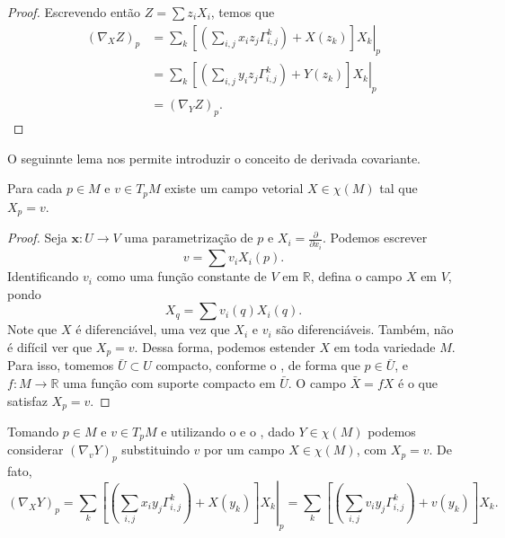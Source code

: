 \begin{lemma}
\begin{proof}
		Escrevendo então $Z=\sum z_{i}X_{i}$, temos que
		\begin{align*}
			(\nabla_{X}Z)_{p} & = \left.\sum_{k}\left[\left( \sum_{i,j}x_{i}z_{j}\Gamma_{i,j}^{k} \right)+X(z_{k})\right]X_{k}\right|_{p} \\
			                  & =\left.\sum_{k}\left[\left( \sum_{i,j}y_{i}z_{j}\Gamma_{i,j}^{k} \right)+Y(z_{k})\right]X_{k}\right|_{p}  \\
			                  & = (\nabla_{Y}Z)_{p}.
		\end{align*}
	\end{proof}
\end{lemma}
O seguinnte lema nos permite introduzir o conceito de derivada covariante.
\begin{lemma}
	\label{lem:vetor-estendido-a-campo}
	Para cada $p \in M$ e $v \in T_{p}M$ existe um campo vetorial $X \in \chi (M)$ tal que $X_{p}=v$.
	\begin{proof}

		Seja $\mathbf{x}:U\to V$ uma parametrização de $p$ e $X_{i}=\frac{\partial}{\partial x_{i}}$. Podemos escrever
		\begin{equation*}
			v=\sum v_{i}X_{i}(p).
		\end{equation*}
		Identificando $v_{i}$ como uma função constante de $V$ em $\mathbb{R}$, defina o campo $X$ em $V$, pondo
		\begin{equation*}
			X_{q}=\sum v_{i}(q)X_{i}(q).
		\end{equation*}
		Note que $X$ é diferenciável, uma vez que $X_{i}$ e $v_{i}$ são diferenciáveis. Também, não é difícil ver que $X_{p}=v$.
		Dessa forma, podemos estender $X$ em toda variedade $M$. Para isso, tomemos $\bar{U}\subset U$ compacto, conforme o , de forma que $p \in \bar{U}$, e $f:M\to \mathbb{R}$ uma função com suporte compacto em $\bar{U}$. O campo $\bar{X}={f}X$ é o que satisfaz $X_{p}=v$.
	\end{proof}
\end{lemma}
Tomando $p \in M$ e $v \in T_{p}M$ e utilizando o  e o , dado $Y \in \chi(M)$ podemos considerar $(\nabla_{v}Y)_{p}$ substituindo $v$ por um campo $X \in \chi(M)$, com $X_{p}=v$. De fato,
\begin{equation*}
	(\nabla_{X}Y)_{p} = \left.\sum_{k}\left[\left( \sum_{i,j}x_{i}y_{j}\Gamma_{i,j}^{k} \right)+X(y_{k})\right]X_{k}\right|_{p} = \sum_{k}\left[\left( \sum_{i,j}v_{i}y_{j}\Gamma_{i,j}^{k} \right)+v(y_{k})\right]X_{k}.
\end{equation*}
